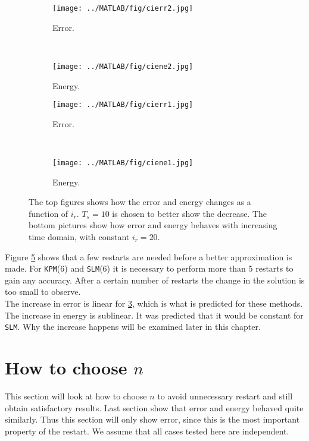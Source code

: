 \begin{figure}[H]
        \centering
        \begin{subfigure}[b]{0.45\textwidth}
                \texttt{[image: ../MATLAB/fig/cierr2.jpg]}
                \caption{ Error. }
                \label{fig:cierr2}
        \end{subfigure}
        ~
		\begin{subfigure}[b]{0.45\textwidth}
                \texttt{[image: ../MATLAB/fig/ciene2.jpg]}
                \caption{ Energy. }
                \label{fig:ciene2}
        \end{subfigure}    

        \begin{subfigure}[b]{0.45\textwidth}
                \texttt{[image: ../MATLAB/fig/cierr1.jpg]}
                \caption{ Error. }
                \label{fig:cierr1}
        \end{subfigure}
        ~
		\begin{subfigure}[b]{0.45\textwidth}
                \texttt{[image: ../MATLAB/fig/ciene1.jpg]}
                \caption{ Energy. }
                \label{fig:ciene1}
        \end{subfigure}
        \caption{ The top figures shows how the error and energy changes as a function of $i_r$. $T_s = 10$ is chosen to better show the decrease. The bottom pictures show how error and energy behaves with increasing time domain, with constant $i_r = 20$. }
        \label{fig:ci}
\end{figure}
Figure \ref{fig:ci} shows that a few restarts are needed before a better approximation is made. For \texttt{KPM}(6) and \texttt{SLM}(6) it is necessary to perform more than 5 restarts to gain any accuracy. After a certain number of restarts the change in the solution is too small to observe.  \\
The increase in error is linear for \ref{fig:cierr1}, which is what is predicted for these methods. \\
The increase in energy is sublinear. It was predicted that it would be constant for \texttt{SLM}. Why the increase happens will be examined later in this chapter.

\section{How to choose $n$}%
\label{sec:resultat}
This section will look at how to choose $n$ to avoid unnecessary restart and still obtain satisfactory results. Last section show that error and energy behaved quite similarly. Thus this section will only show error, since this is the most important property of the restart. We assume that all cases tested here are independent.

